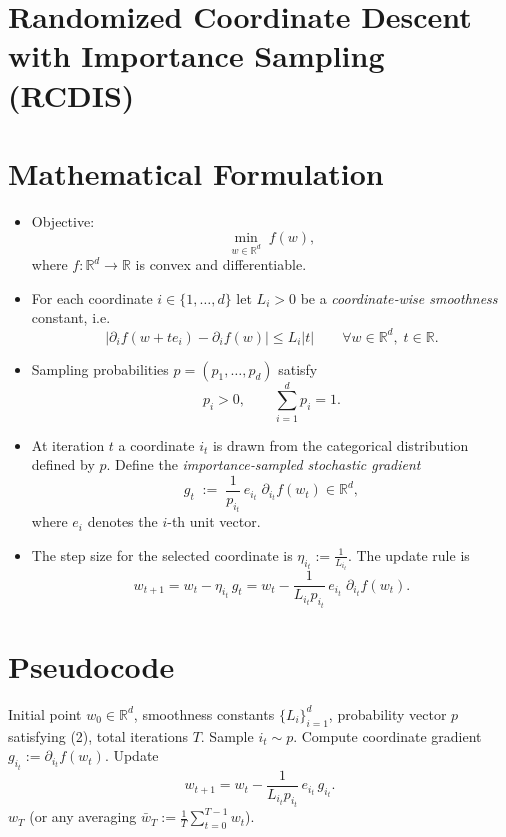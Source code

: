 \documentclass[11pt]{article}
\newcommand{\R}{\mathbb{R}}
\begin{document}
\section*{Randomized Coordinate Descent with Importance Sampling (RCDIS)}

\section*{Mathematical Formulation}
\begin{itemize}
    \item Objective: 
    \[
        \min_{w\in\R^{d}} \; f(w),
    \]
    where \(f:\R^{d}\to\R\) is convex and differentiable.
    \item For each coordinate \(i\in\{1,\dots ,d\}\) let \(L_{i}>0\) be a \emph{coordinate‑wise smoothness} constant, i.e.
    \[
        \big| \partial_{i}f(w+te_{i})-\partial_{i}f(w) \big|\le L_{i}|t|\qquad\forall w\in\R^{d},\;t\in\R .
    \tag{1}
    \]
    \item Sampling probabilities \(p=(p_{1},\dots ,p_{d})\) satisfy 
    \[
        p_{i}>0,\qquad \sum_{i=1}^{d}p_{i}=1 .
    \tag{2}
    \]
    \item At iteration \(t\) a coordinate \(i_{t}\) is drawn from the categorical distribution defined by \(p\).  
    Define the \emph{importance‑sampled stochastic gradient}
    \[
        g_{t}\;:=\;\frac{1}{p_{i_{t}}}\,e_{i_{t}}\;\partial_{i_{t}}f(w_{t})\in\R^{d},
    \tag{3}
    \]
    where \(e_{i}\) denotes the \(i\)-th unit vector.
    \item The step size for the selected coordinate is \(\eta_{i_{t}}:=\frac{1}{L_{i_{t}}}\).  
    The update rule is
    \[
        w_{t+1}= w_{t}-\eta_{i_{t}}\,g_{t}
        = w_{t}-\frac{1}{L_{i_{t}}p_{i_{t}}}\,e_{i_{t}}\;\partial_{i_{t}}f(w_{t}).
    \tag{4}
    \]
\end{itemize}

\section*{Pseudocode}
\begin{algorithm}[H]
\caption{RCDIS}
\begin{algorithmic}[1]
\REQUIRE Initial point \(w_{0}\in\R^{d}\), smoothness constants \(\{L_{i}\}_{i=1}^{d}\), probability vector \(p\) satisfying (2), total iterations \(T\).
    \STATE Sample $i_{t}\sim p$.
    \STATE Compute coordinate gradient $g_{i_{t}}:=\partial_{i_{t}}f(w_{t})$.
    \STATE Update 
    \[
        w_{t+1}= w_{t}-\frac{1}{L_{i_{t}}p_{i_{t}}}\,e_{i_{t}}\,g_{i_{t}} .
    \]
\ENDFOR
\RETURN $w_{T}$ (or any averaging $\bar w_T:=\frac1T\sum_{t=0}^{T-1}w_{t}$).
\end{algorithmic}
\end{algorithm}
\end{document}
